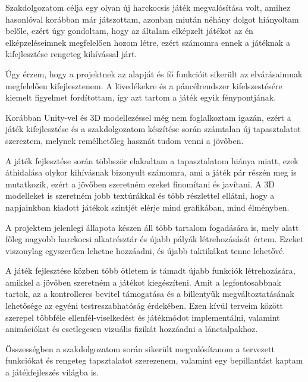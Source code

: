 \documentclass[
]{thesis-ekf}
\theoremstyle{definition}
\theoremstyle{remark}
\begin{document}
Szakdolgozatom célja egy olyan új harckocsis játék megvalósítása volt, amihez hasonlóval korábban már játszottam, azonban miután néhány dolgot hiányoltam belőle, ezért úgy gondoltam, hogy az általam elképzelt játékot az én elképzeléseimnek megfelelően hozom létre, ezért számomra ennek a játéknak a kifejlesztése rengeteg kihívással járt.

Úgy érzem, hogy a projektnek az alapját és fő funkcióit sikerült az elvárásaimnak megfelelően kifejlesztenem. A lövedékekre és a páncélrendszer kifelszestésére kiemelt figyelmet fordítottam, így azt tartom a játék egyik fénypontjának.

Korábban Unity-vel és 3D modellezéssel még nem foglalkoztam igazán, ezért a játék kifejlesztése és a szakdolgozatom készítése során számtalan új tapasztalatot szereztem, melynek remélhetőleg hasznát tudom venni a jövőben.

A játék fejlesztése során többször elakadtam a tapasztalatom hiánya miatt, ezek áthidalása olykor kihívásnak bizonyult számomra, ami a játék pár részén meg is mutatkozik, ezért a jövőben szeretném ezeket finomítani és javítani. A 3D modelleket is szeretném jobb textúrákkal és több részlettel ellátni, hogy a napjainkban kiadott játékok szintjét elérje mind grafikában, mind élményben.

A projektem jelenlegi állapota készen áll több tartalom fogadására is, mely alatt főleg nagyobb harckocsi alkatrésztár és újabb pályák létrehozásását értem. Ezeket viszonylag egyszerűen lehetne hozzáadni, és újabb taktikákat tenne lehetővé.

A játék fejlesztése közben több ötletem is támadt újabb funkciók létrehozására, amikkel a jövőben szeretném a játékot kiegészíteni. Amit a legfontosabbnak tartok, az a kontrolleres bevitel támogatása és a billentyűk megváltoztatásának lehetősége az egyéni testreszabhatóság érdekében. Ezen kívül terveim között szerepel többféle ellenfél-viselkedést és játékmódot implementálni, valamint animációkat és esetlegesen vizuális fizikát hozzáadni a lánctalpakhoz.

Összességben a szakdolgozatom során sikerült megvalósítanom a tervezett funkciókat és rengeteg tapsztalatot szerezenem, valamint egy bepillantást kaptam a játékfejleszés világba is.
\end{document}
